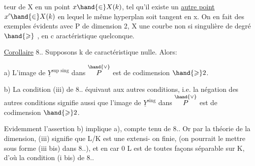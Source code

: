 
teur de X en un point $x\hand{\in} X(k)$,  tel qu'il existe un \uline{autre point}
$x'\hand{\in} X(k)$ en lequel le même hyperplan soit tangent en x. On en fait des
exemples évidents avec  P de dimension 2, X une courbe non si
singulière de degré $\hand{\geqslant}$  , en c aractéristique quelconque. 

\uline{Corollaire} 8.. Supposons k de caractéristique nulle. Alors:

a) L'image de $\underline{Y}^{\text{sup sing}}$ dans $\overset{\hand{\vee}}{P}$ est de codimension $\hand{\geqslant} 2$.

b) La condition (iii) de 8.. équivaut aux autres conditions, i.e.
la négation des autres conditions\hand{,}  signifie aussi que l'image de $\underline{Y}^{\text{sing}}$
dans $\overset{\hand{\vee}}{P}$ est de codimension $\hand{\geqslant} 2$.

Evidemment l'assertion b) implique a), compte tenu de 8.. Or
par la théorie de la dimension, (iii) signifie que L/K est une extensi-%
on finie,  (on pourrait le mettre sous forme (iii bis) dans 8..),
et en car 0  L est de toutes façons séparable sur K, d'où
la condition (i bis) de 8..

